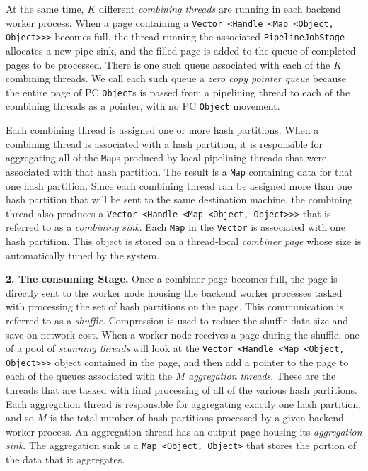 At the same time, 
$K$ different \emph{combining threads} are running in each backend worker process.  
When a page containing a \texttt{Vector <Handle <Map <Object,
  Object}\texttt{>}\texttt{>}\texttt{>} becomes full, the thread running the associated
\texttt{PipelineJobStage} allocates a new pipe sink,
and the filled page is added to the queue of completed pages to be processed.  There is one such queue
associated with each of the $K$ combining threads.
We call each such queue a \emph{zero copy pointer queue} because the entire page of PC \texttt{Object}s is passed from a pipelining thread to each of the
combining threads as a pointer, with no PC \texttt{Object} movement.

Each combining thread is assigned one or more hash partitions.  When a combining thread
is associated with a hash partition, it is responsible for 
aggregating all of the \texttt{Map}s produced by local pipelining threads that were associated with that hash partition.
The result is a 
\texttt{Map} containing data for that one hash partition.  Since each combining
thread can be assigned more than one hash partition that will be sent to the same destination machine,
the combining thread also produces a \texttt{Vector <Handle <Map <Object, Object}\texttt{>}\texttt{>}\texttt{>} that is referred to as a \emph{combining sink}.
Each \texttt{Map} in the \texttt{Vector} is associated with one hash partition.
This object is stored on a thread-local \emph{combiner page} whose size is automatically tuned by the system.

\vspace{5pt}
{\bf 2. The consuming Stage.}
Once a combiner page becomes full, the page is directly sent to the worker node housing the
backend worker processes tasked with processing the set of hash partitions on the page.
This communication is referred to as a \emph{shuffle}.  
Compression is used to reduce the shuffle data size and save on network cost.
When a worker node receives a page during the shuffle, one of a pool of \emph{scanning threads} will look at the 
\texttt{Vector <Handle <Map <Object, Object}\texttt{>}\texttt{>}\texttt{>} object contained in the page, and then add a pointer to the page
to each of the queues associated with the $M$ \emph{aggregation threads}.  These are the threads
that are tasked with final processing of all of the various hash partitions.
Each aggregation thread is responsible for aggregating exactly 
one hash partition, and so $M$ is the total number of hash partitions processed by a given backend worker process.
An aggregation thread has an output page housing its \emph{aggregation sink}.  The aggregation sink is a \texttt{Map <Object, Object>} that stores the portion of the
data that it aggregates.

